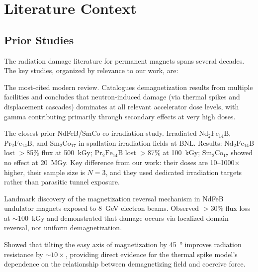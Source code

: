 \documentclass[11pt,letterpaper]{article}
\begin{document}
\section{Literature Context}
\label{sec:literature}

\subsection{Prior Studies}

The radiation damage literature for permanent magnets spans several decades.
The key studies, organized by relevance to our work, are:

\begin{description}[style=nextline]
    \item[Shen et al.\ \cite{Shen2018}]
    The most-cited modern review. Catalogues demagnetization results from
    multiple facilities and concludes that neutron-induced damage (via thermal
    spikes and displacement cascades) dominates at all relevant accelerator
    dose levels, with gamma contributing primarily through secondary effects at
    very high doses.

    \item[Simos et al.\ \cite{Simos2018}]
    The closest prior NdFeB/SmCo co-irradiation study. Irradiated
    $\mathrm{Nd_2Fe_{14}B}$, $\mathrm{Pr_2Fe_{14}B}$, and
    $\mathrm{Sm_2Co_{17}}$ in spallation irradiation fields at BNL. Results:
    $\mathrm{Nd_2Fe_{14}B}$ lost $>$85\% flux at \SI{500}{kGy};
    $\mathrm{Pr_2Fe_{14}B}$ lost $>$87\% at \SI{100}{kGy}; $\mathrm{Sm_2Co_{17}}$
    showed no effect at \SI{20}{MGy}. Key difference from our work: their
    doses are 10--1000$\times$ higher, their sample size is $N = 3$, and they
    used dedicated irradiation targets rather than parasitic tunnel exposure.

    \item[Bizen et al.\ (2016) \cite{Bizen2016}]
    Landmark discovery of the magnetization reversal mechanism in NdFeB
    undulator magnets exposed to \SI{8}{GeV} electron beams. Observed $>$30\%
    flux loss at $\sim$\SI{100}{kGy} and demonstrated that damage occurs via
    localized domain reversal, not uniform demagnetization.

    \item[Bizen et al.\ (2018) \cite{Bizen2018}]
    Showed that tilting the easy axis of magnetization by \SI{45}{\degree}
    improves radiation resistance by $\sim$$10\times$, providing direct
    evidence for the thermal spike model's dependence on the relationship
    between demagnetizing field and coercive force.


\end{description}
\end{document}
